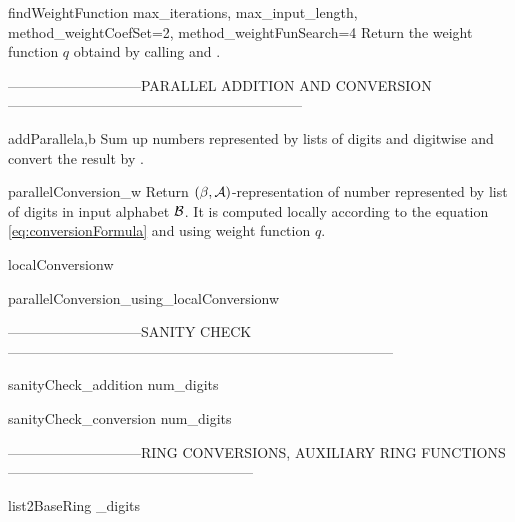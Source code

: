 \begin{method}{findWeightFunction}{ max\_iterations, max\_input\_length, method\_weightCoefSet=2, method\_weightFunSearch=4}
Return the weight function $q$ obtaind by calling  and .
\end{method}


-----------------------------PARALLEL ADDITION AND CONVERSION---------------------------------------------------------------

\begin{method}{addParallel}{a,b}
Sum up numbers represented by lists of digits  and  digitwise and convert the result by . 
\end{method}


\begin{method}{parallelConversion}{\_w}
Return $(\beta,\mathcal{A})$-representation of number represented by list  of digits in input alphabet $\mathcal{B}$. It is computed locally according to the equation \ref{eq:conversionFormula} and using weight function $q$.
\end{method}


\begin{method}{localConversion}{w}

\end{method}


\begin{method}{parallelConversion\_using\_localConversion}{w}

\end{method}


-----------------------------SANITY CHECK-----------------------------------------------------------------------------------

\begin{method}{sanityCheck\_addition}{ num\_digits}

\end{method}


\begin{method}{sanityCheck\_conversion}{ num\_digits}

\end{method}


-----------------------------RING CONVERSIONS, AUXILIARY RING FUNCTIONS-----------------------------------------------------

\begin{method}{list2BaseRing}{ \_digits}

\end{method}


